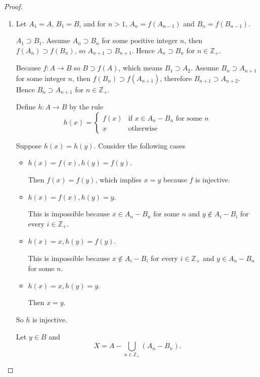 \begin{proof}
    \begin{enumerate}[label={(\alph*)}]
        \item Let $A_{1} = A$, $B_{1} = B$, and for $n > 1$, $A_{n} = f(A_{n-1})$ and $B_{n} = f(B_{n-1})$.

              $A_{1}\supset B_{1}$. Assume $A_{n}\supset B_{n}$ for some positive integer $n$, then $f(A_{n})\supset f(B_{n})$, so $A_{n+1}\supset B_{n+1}$. Hence $A_{n}\supset B_{n}$ for $n\in\mathbb{Z}_{+}$.

              Because $f: A\to B$ so $B\supset f(A)$, which means $B_{1}\supset A_{2}$. Assume $B_{n}\supset A_{n+1}$ for some integer $n$, then $f(B_{n})\supset f(A_{n+1})$, therefore $B_{n+1}\supset A_{n+2}$. Hence $B_{n}\supset A_{n+1}$ for $n\in\mathbb{Z}_{+}$.

              Define $h: A\to B$ by the rule
              \[
                  h(x) = \begin{cases}f(x) & \text{if $x\in A_{n} - B_{n}$ for some $n$} \\ x & \text{otherwise}\end{cases}
              \]

              Suppose $h(x) = h(y)$. Consider the following cases
              \begin{itemize}
                  \item $h(x) = f(x), h(y) = f(y)$.

                        Then $f(x) = f(y)$, which implies $x = y$ because $f$ is injective.
                  \item $h(x) = f(x), h(y) = y$.

                        This is impossible because $x\in A_{n} - B_{n}$ for some $n$ and $y\notin A_{i} - B_{i}$ for every $i\in\mathbb{Z}_{+}$.
                  \item $h(x) = x, h(y) = f(y)$.

                        This is impossible because $x\notin A_{i} - B_{i}$ for every $i\in\mathbb{Z}_{+}$ and $y\in A_{n} - B_{n}$ for some $n$.
                  \item $h(x) = x, h(y) = y$.

                        Then $x = y$.
              \end{itemize}

              So $h$ is injective.

              Let $y\in B$ and
              \[
                  X = A - \bigcup_{n\in\mathbb{Z}_{+}}(A_{n} - B_{n}).
              \]


\end{enumerate}
\end{proof}
